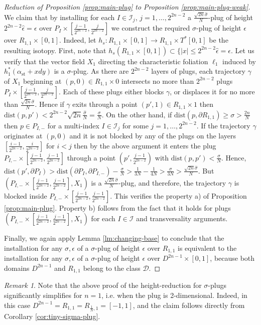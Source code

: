 \documentclass[12pt]{amsart}
\theoremstyle{plain}
\theoremstyle{definition}
\theoremstyle{remark}
\newtheorem{remark}[theorem]{Remark}
\newcommand{\D}{\mathcal{D}}
\newcommand{\I}{\mathcal{I}}
\newcommand{\eps}{\epsilon}
\newcommand{\p}{\partial}
\newcommand{\wh}{\widehat}
\newcommand{\dist}{\mathrm{dist}}
\newcommand{\st}{\mathrm{st}}
\begin{document}
\begin{proof}[Reduction of  Proposition \ref{prop:main-plug} to Proposition \ref{prop:main-plug-weak}]
We claim that by installing for  each  $I\in\I_j$, $j=1,\dots, 2^{2n-2}$   a 
  $\frac{\sqrt{2n}\wh\sigma}N$-plug   of height $2^{2n-2}\wh \eps=\eps$ over $P_I\times[\frac{j-1}{2^{2n-2}}, \frac{j}{2^{2n-2}}]$ we construct the required $\sigma$-plug of height $\eps$ over $R_{1,1}\times[0,1]$.
   Indeed,   let  $h_s:R_{1,1}\times[0,1]\to R_{1,1}\times T^*[0,1]$ be the resulting isotopy. First, note that $h_s(R_{1,1}\times[0,1])\subset \{|x|\leq 2^{2n-2}\wh\eps=\eps$.  Let us verify that the vector field $X_1$ directing the characteristic foliation $\ell_1$ induced by $h_1^*(\alpha_\st+xdy)$ is a $\sigma$-plug.
  As there are    $2^{2n-2}$ layers of plugs,  each  trajectory $\gamma$ of $X_1$ beginning at $(p,0)\in R_{1,1}\times 0$ intersects no more than $2^{2n-2}$ plugs $ P_I\times[\frac{j-1}{2^{2n-2}}, \frac{j}{2^{2n-2}}]$. Each of these plugs either blocks $\gamma$, or displaces it for no more than $\frac{\sqrt{2n}\wh\sigma}N$. Hence  if $\gamma$ exits through a point $(p',1)\in R_{1,1}\times 1$ then $\dist(p,p')< 2^{2n-2}\sqrt{2n}\frac{\wh\sigma}N=\frac\sigma N$. On the other hand, if $\dist(p,\p R_{1,1})\geq\sigma>\frac{2n}N$ then $p\in P_{I,-}$ for a multi-index $I\in\I_j$ for some $j=1,\dots, 2^{2n-2}$. If the trajectory $\gamma$ originates at $(p,0)$ and it is not blocked by any of the plugs on the layers $ [\frac{i-1}{2^{2n-2}}, \frac{i}{2^{2n-2}}]$ for $i<j$ then by the above argument it enters the plug $P_{I,-}\times [\frac{j-1}{2^{2n-2}}, \frac{j-1}{2^{2n-2}}] $ through a point $(p',  \frac{j-1}{2^{2n-2}})$ with $\dist(p,p')<\frac\sigma N$. Hence, $\dist (p',\p P_I)>\dist(\p P_I,\p P_{I,-})-\frac\sigma N>\frac1{3N}-\frac1{4N}>\frac{\sigma}{3N}>\frac{\sqrt{2n}\wh\sigma}N$. But   $(P_{I,-}\times [\frac{j-1}{2^{2n-2}}, \frac{j-1}{2^{2n-2}}], X_1) $  is a $\frac{\sqrt{2n}\wh\sigma}N$-plug, and therefore, the trajectory $\gamma$ is blocked inside $P_{I,-}\times [\frac{j-1}{2^{2n-2}}, \frac{j-1}{2^{2n-2}}] $.
 This verifies the property a) of  Proposition \ref{prop:main-plug}. Property b) follows from the fact that it holds for plugs  $(P_{I,-}\times [\frac{j-1}{2^{2n-2}}, \frac{j-1}{2^{2n-2}}],X_1) $ for each $I\in\I$ and transversality arguments. 
 
 Finally, we again apply Lemma \ref{lm:changing-base} to conclude that the installation for any $\sigma,\eps$ of a $\sigma$-plug of height $\eps$ over $R_{1,1}$ is equivalent to the   installation for any $\sigma,\eps$ of a $\sigma$-plug of height $\eps$ over $D^{2n-1}\times[0,1]$, because both domains $D^{2n-1}$ and $R_{1,1}$ belong to the class $\D$.
    \end{proof} 
    \begin{remark}\label{rem:2d}
    Note that the above proof of the height-reduction  for   $\sigma$-plugs significantly simplifies for $n=1$, i.e. when the plug is 2-dimensional.
    Indeed, in this case $D^{2n-1}=R_{1,1}=R_{\frac1N,1}=[-1,1]$, and the claim follows  directly from Corollary \ref{cor:tiny-sigma-plug}.
    \end{remark}
    
\end{document}
